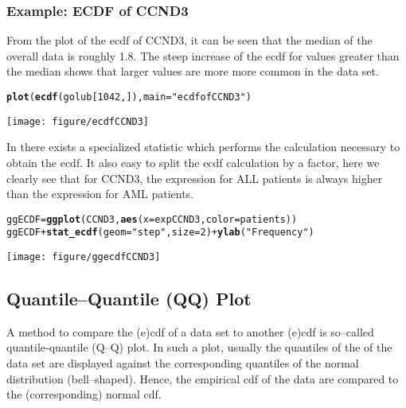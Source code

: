 \documentclass{article}\usepackage[]{graphicx}\usepackage[usenames,dvipsnames]{color}
\makeatletter
\def\maxwidth{ %
  \ifdim\Gin@nat@width>\linewidth
    \linewidth
  \else
    \Gin@nat@width
  \fi
}
\newcommand{\hlnum}[1]{\textcolor[rgb]{0.686,0.059,0.569}{#1}}%
\newcommand{\hlstr}[1]{\textcolor[rgb]{0.192,0.494,0.8}{#1}}%
\newcommand{\hlopt}[1]{\textcolor[rgb]{0,0,0}{#1}}%
\newcommand{\hlstd}[1]{\textcolor[rgb]{0.345,0.345,0.345}{#1}}%
\newcommand{\hlkwb}[1]{\textcolor[rgb]{0.69,0.353,0.396}{#1}}%
\newcommand{\hlkwc}[1]{\textcolor[rgb]{0.333,0.667,0.333}{#1}}%
\newcommand{\hlkwd}[1]{\textcolor[rgb]{0.737,0.353,0.396}{\textbf{#1}}}%
\newenvironment{kframe}{%
 \def\at@end@of@kframe{}%
 \ifinner\ifhmode%
  \def\at@end@of@kframe{\end{minipage}}%
  \begin{minipage}{\columnwidth}%
 \fi\fi%
 \def\FrameCommand##1{\hskip\@totalleftmargin \hskip-\fboxsep
 \colorbox{shadecolor}{##1}\hskip-\fboxsep
     \hskip-\linewidth \hskip-\@totalleftmargin \hskip\columnwidth}%
 \MakeFramed {\advance\hsize-\width
   \@totalleftmargin\z@ \linewidth\hsize
   \@setminipage}}%
 {\par\unskip\endMakeFramed%
 \at@end@of@kframe}
\newenvironment{knitrout}{}{} %
\makeatother
\begin{document}
\subsubsection*{Example: ECDF of CCND3}
From the plot of the ecdf of CCND3, it can be seen that the
median of the overall data is roughly 1.8. The steep increase of the ecdf for
values greater than the median shows that larger values are more more common
in the data set.

\begin{knitrout}
\color{fgcolor}\begin{kframe}
\begin{alltt}
\hlkwd{plot}\hlstd{(}\hlkwd{ecdf}\hlstd{(golub[}\hlnum{1042}\hlstd{, ]) ,} \hlkwc{main} \hlstd{=} \hlstr{"ecdf of CCND3"}\hlstd{)}
\end{alltt}
\end{kframe}
\texttt{[image: figure/ecdfCCND3]} 

\end{knitrout}

In  there exists a specialized statistic which performs
the calculation necessary to obtain the ecdf. It also easy to split the
ecdf calculation by a factor, here we clearly see that for CCND3, 
the expression for ALL patients is always higher than the expression for
AML patients.

\begin{knitrout}
\color{fgcolor}\begin{kframe}
\begin{alltt}
\hlstd{ggECDF}\hlkwb{=}  \hlkwd{ggplot}\hlstd{(CCND3,} \hlkwd{aes}\hlstd{(}\hlkwc{x}\hlstd{=expCCND3,} \hlkwc{color} \hlstd{= patients))}
\hlstd{ggECDF} \hlopt{+} \hlkwd{stat_ecdf}\hlstd{(}\hlkwc{geom} \hlstd{=} \hlstr{"step"}\hlstd{,} \hlkwc{size} \hlstd{=} \hlnum{2}\hlstd{)} \hlopt{+} \hlkwd{ylab}\hlstd{(}\hlstr{"Frequency"}\hlstd{)}
\end{alltt}
\end{kframe}
\texttt{[image: figure/ggecdfCCND3]} 

\end{knitrout}


\subsection{Quantile--Quantile (QQ) Plot}
A method to compare the (e)cdf of  a data set to another (e)cdf is  
so--called quantile-quantile (Q--Q) plot. In such a plot, usually the quantiles of the
of the data set are displayed against the corresponding quantiles of
the normal distribution (bell--shaped). Hence, the empirical cdf of the
data are compared to the (corresponding) normal cdf.  \\
\end{document}
